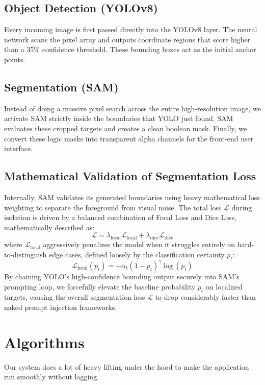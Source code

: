 \documentclass[10pt, conference]{IEEEtran}
\begin{document}
\subsection{Object Detection (YOLOv8)}
Every incoming image is first passed directly into the YOLOv8 layer. The neural network scans the pixel array and outputs coordinate regions that score higher than a 35\% confidence threshold. These bounding boxes act as the initial anchor points.

\subsection{Segmentation (SAM)}
Instead of doing a massive pixel search across the entire high-resolution image, we activate SAM strictly inside the boundaries that YOLO just found. SAM evaluates these cropped targets and creates a clean boolean mask. Finally, we convert these logic masks into transparent alpha channels for the front-end user interface.

\subsection{Mathematical Validation of Segmentation Loss}
Internally, SAM validates its generated boundaries using heavy mathematical loss weighting to separate the foreground from visual noise. The total loss $\mathcal{L}$ during isolation is driven by a balanced combination of Focal Loss and Dice Loss, mathematically described as:
\begin{equation}
\mathcal{L} = \lambda_{\textrm{focal}} \mathcal{L}_{\textrm{focal}} + \lambda_{\textrm{dice}} \mathcal{L}_{\textrm{dice}}
\end{equation}
where $\mathcal{L}_{\textrm{focal}}$ aggressively penalizes the model when it struggles entirely on hard-to-distinguish edge cases, defined loosely by the classification certainty $p_t$:
\begin{equation}
\mathcal{L}_{\textrm{focal}}(p_t) = -\alpha_t (1-p_t)^\gamma \log(p_t)
\end{equation}
By chaining YOLO's high-confidence bounding output securely into SAM's prompting loop, we forcefully elevate the baseline probability $p_t$ on localized targets, causing the overall segmentation loss $\mathcal{L}$ to drop considerably faster than naked prompt injection frameworks.

\section{Algorithms}
Our system does a lot of heavy lifting under the hood to make the application run smoothly without lagging.
\end{document}
